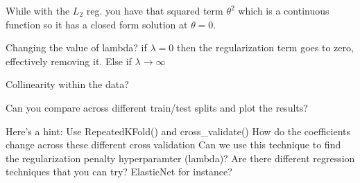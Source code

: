 \documentclass[11pt]{article}
\makeatletter
\newcommand{\boxspacing}{\kern\kvtcb@left@rule\kern\kvtcb@boxsep}
\newcommand{\prompt}[4]{
        {\ttfamily\llap{{\color{#2}[#3]:\hspace{3pt}#4}}\vspace{-\baselineskip}}
    }
\makeatother
\begin{document}
While with the \(L_2\) reg. you have that squared term \(\theta^2\)
which is a continuous function so it has a closed form solution at
\(\theta = 0\).

Changing the value of lambda? if \(\lambda = 0\) then the regularization
term goes to zero, effectively removing it. Else if
\(\lambda \to \infty\)

Collinearity within the data?

Can you compare across different train/test splits and plot the results?

Here's a hint: Use RepeatedKFold() and cross\_validate() How do the
coefficients change across these different cross validation Can we use
this technique to find the regularization penalty hyperparamter
(lambda)? Are there different regression techniques that you can try?
ElasticNet for instance?

    \begin{tcolorbox}[breakable, size=fbox, boxrule=1pt, pad at break*=1mm,colback=cellbackground, colframe=cellborder]
\prompt{In}{incolor}{ }{\boxspacing}
\begin{Verbatim}[commandchars=\\\{\}]

\end{Verbatim}
\end{tcolorbox}

    \begin{tcolorbox}[breakable, size=fbox, boxrule=1pt, pad at break*=1mm,colback=cellbackground, colframe=cellborder]
\prompt{In}{incolor}{ }{\boxspacing}
\begin{Verbatim}[commandchars=\\\{\}]

\end{Verbatim}
\end{tcolorbox}


    
    
    
\end{document}
